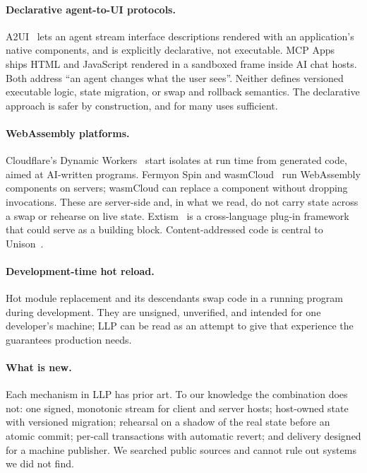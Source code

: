 \documentclass[10pt,twocolumn]{article}
\begin{document}
\paragraph{Declarative agent-to-UI protocols.} A2UI~\cite{a2ui} lets an agent stream interface
descriptions rendered with an application's native components, and is explicitly declarative, not
executable. MCP Apps~\cite{mcpapps} ships HTML and JavaScript rendered in a sandboxed frame inside
AI chat hosts. Both address ``an agent changes what the user sees''. Neither defines versioned
executable logic, state migration, or swap and rollback semantics. The declarative approach is
safer by construction, and for many uses sufficient.

\paragraph{WebAssembly platforms.} Cloudflare's Dynamic Workers~\cite{dynamicworkers} start
isolates at run time from generated code, aimed at AI-written programs. Fermyon Spin and
wasmCloud~\cite{wasmcloud} run WebAssembly components on servers; wasmCloud can replace a
component without dropping invocations. These are server-side and, in what we read, do not carry
state across a swap or rehearse on live state. Extism~\cite{extism} is a cross-language plug-in
framework that could serve as a building block. Content-addressed code is central to
Unison~\cite{unison}.

\paragraph{Development-time hot reload.} Hot module replacement and its descendants swap code in a
running program during development. They are unsigned, unverified, and intended for one
developer's machine; LLP can be read as an attempt to give that experience the guarantees
production needs.

\paragraph{What is new.} Each mechanism in LLP has prior art. To our knowledge the combination
does not: one signed, monotonic stream for client and server hosts; host-owned state with
versioned migration; rehearsal on a shadow of the real state before an atomic commit; per-call
transactions with automatic revert; and delivery designed for a machine publisher. We searched
public sources and cannot rule out systems we did not find.
\end{document}
